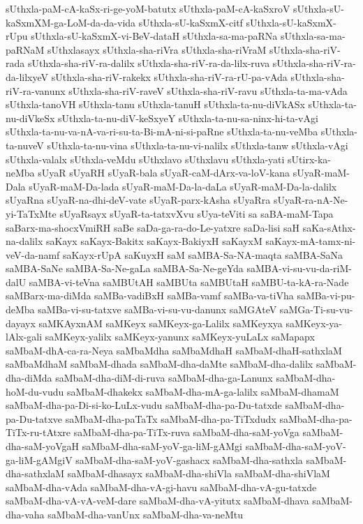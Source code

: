 {sUthxla-paM-cA-kaSx-ri-ge-yoM-batutx
sUthxla-paM-cA-kaSxroV
sUthxla-sU-kaSxmXM-ga-LoM-da-da-vida
sUthxla-sU-kaSxmX-citf
sUthxla-sU-kaSxmX-rUpu
sUthxla-sU-kaSxmX-vi-BeV-dataH
sUthxla-sa-ma-paRNa
sUthxla-sa-ma-paRNaM
sUthxlasayx
sUthxla-sha-riVra
sUthxla-sha-riVraM
sUthxla-sha-riV-rada
sUthxla-sha-riV-ra-dalilx
sUthxla-sha-riV-ra-da-lilx-ruva
sUthxla-sha-riV-ra-da-lilxyeV
sUthxla-sha-riV-rakekx
sUthxla-sha-riV-ra-rU-pa-vAda
sUthxla-sha-riV-ra-vanunx
sUthxla-sha-riV-raveV
sUthxla-sha-riV-ravu
sUthxla-ta-ma-vAda
sUthxla-tanoVH
sUthxla-tanu
sUthxla-tanuH
sUthxla-ta-nu-diVkASx
sUthxla-ta-nu-diVkeSx
sUthxla-ta-nu-diV-keSxyeY
sUthxla-ta-nu-sa-ninx-hi-ta-vAgi
sUthxla-ta-nu-va-nA-va-ri-su-ta-Bi-mA-ni-si-paRne
sUthxla-ta-nu-veMba
sUthxla-ta-nuveV
sUthxla-ta-nu-vina
sUthxla-ta-nu-vi-nalilx
sUthxla-tanw
sUthxla-vAgi
sUthxla-valalx
sUthxla-veMdu
sUthxlavo
sUthxlavu
sUthxla-yati
sUtirx-ka-neMba
sUyaR
sUyaRH
sUyaR-bala
sUyaR-caM-dArx-va-loV-kana
sUyaR-maM-Dala
sUyaR-maM-Da-lada
sUyaR-maM-Da-la-daLa
sUyaR-maM-Da-la-dalilx
sUyaRna
sUyaR-na-dhi-deV-vate
sUyaR-parx-kAsha
sUyaRra
sUyaR-ra-nA-Ne-yi-TaTxMte
sUyaRsayx
sUyaR-ta-tatxvXvu
sUya-teViti
sa
saBA-maM-Tapa
saBarx-ma-shocxVmiRH
saBe
saDa-ga-ra-do-Le-yatxre
saDa-lisi
saH
saKa-sAthx-na-dalilx
saKayx
saKayx-Bakitx
saKayx-BakiyxH
saKayxM
saKayx-mA-tamx-ni-veV-da-namf
saKayx-rUpA
saKuyxH
saM
saMBA-Sa-NA-maqta
saMBA-SaNa
saMBA-SaNe
saMBA-Sa-Ne-gaLa
saMBA-Sa-Ne-geYda
saMBA-vi-su-vu-da-riM-dalU
saMBA-vi-teVna
saMBUtAH
saMBUta
saMBUtaH
saMBU-ta-kA-ra-Nade
saMBarx-ma-diMda
saMBa-vadiBxH
saMBa-vamf
saMBa-va-tiVha
saMBa-vi-pu-deMba
saMBa-vi-su-tatxve
saMBa-vi-su-vu-danunx
saMGAteV
saMGa-Ti-su-vu-dayayx
saMKAyxnAM
saMKeyx
saMKeyx-ga-Lalilx
saMKeyxya
saMKeyx-ya-lAlx-gali
saMKeyx-yalilx
saMKeyx-yanunx
saMKeyx-yuLaLx
saMapapx
saMbaM-dhA-ca-ra-Neya
saMbaMdha
saMbaMdhaH
saMbaM-dhaH-sathxlaM
saMbaMdhaM
saMbaM-dhada
saMbaM-dha-daMte
saMbaM-dha-dalilx
saMbaM-dha-diMda
saMbaM-dha-diM-di-ruva
saMbaM-dha-ga-Lanunx
saMbaM-dha-hoM-du-vudu
saMbaM-dhakekx
saMbaM-dha-mA-ga-lalilx
saMbaM-dhamaM
saMbaM-dha-pa-Di-si-ko-LuLx-vudu
saMbaM-dha-pa-Du-tatxde
saMbaM-dha-pa-Du-tatxve
saMbaM-dha-paTaTx
saMbaM-dha-pa-TiTxdudx
saMbaM-dha-pa-TiTx-ru-tAtxre
saMbaM-dha-pa-TiTx-ruva
saMbaM-dha-saM-yoVga
saMbaM-dha-saM-yoVgaH
saMbaM-dha-saM-yoV-ga-liM-gAMgi
saMbaM-dha-saM-yoV-ga-liM-gAMgiV
saMbaM-dha-saM-yoV-gashacx
saMbaM-dha-sathxla
saMbaM-dha-sathxlaM
saMbaM-dhasayx
saMbaM-dha-shiVla
saMbaM-dha-shiVlaM
saMbaM-dha-vAda
saMbaM-dha-vA-gi-havu
saMbaM-dha-vA-gu-tatxde
saMbaM-dha-vA-vA-veM-dare
saMbaM-dha-vA-yitutx
saMbaM-dhava
saMbaM-dha-vaha
saMbaM-dha-vanUnx
saMbaM-dha-va-neMtu
}
